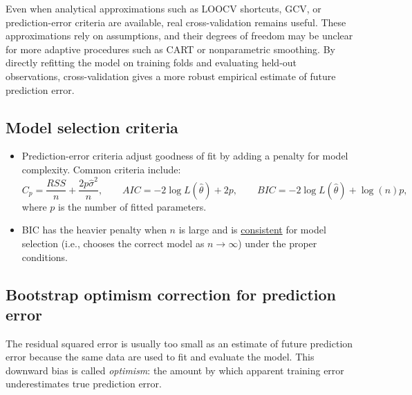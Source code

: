 Even when analytical approximations such as LOOCV shortcuts, GCV, or prediction-error criteria are available, real cross-validation remains useful. These approximations rely on assumptions, and their degrees of freedom may be unclear for more adaptive procedures such as CART or nonparametric smoothing. By directly refitting the model on training folds and evaluating held-out observations, cross-validation gives a more robust empirical estimate of future prediction error.

\subsection{Model selection criteria}
\begin{itemize}
    \item Prediction-error criteria adjust goodness of fit by adding a penalty for model complexity. Common criteria include:
    \[
        C_p=\frac{RSS}{n}+\frac{2p\hat\sigma^2}{n},
        \qquad
        AIC=-2\log L(\hat\theta)+2p,
        \qquad
        BIC=-2\log L(\hat\theta)+\log(n)p,
    \]
    where $p$ is the number of fitted parameters. 
    \item BIC has the heavier penalty when $n$ is large and is \underline{consistent} for model selection (i.e., chooses the  correct model as $n\to \infty$) under the proper conditions.
\end{itemize}

\subsection{Bootstrap optimism correction for prediction error}

The residual squared error is usually too small as an estimate of future prediction error because the same data are used to fit and evaluate the model. This downward bias is called \emph{optimism}: the amount by which apparent training error underestimates true prediction error.

